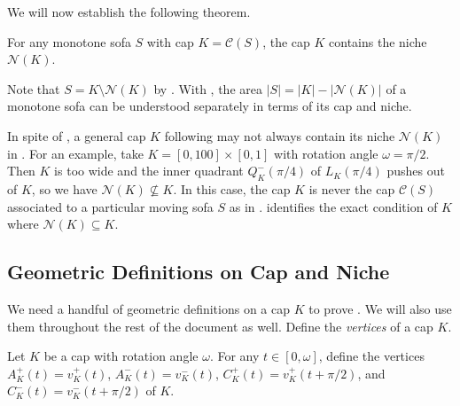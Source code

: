 We will now establish the following theorem.

\begin{theorem}

For any monotone sofa \(S\) with cap \(K = \mathcal{C}(S)\), the cap \(K\) contains the niche \(\mathcal{N}(K)\).

\label{thm:niche-in-cap}
\end{theorem}

Note that \(S = K \setminus \mathcal{N}(K)\) by . With , the area \(|S| = |K| - |\mathcal{N}(K)|\) of a monotone sofa can be understood separately in terms of its cap and niche.

\begin{remark}

In spite of , a general cap \(K\) following  may not always contain its niche \(\mathcal{N}(K)\) in . For an example, take \(K = [0, 100] \times [0, 1]\) with rotation angle \(\omega = \pi/2\). Then \(K\) is too wide and the inner quadrant \(Q_K^-(\pi/4)\) of \(L_K(\pi/4)\) pushes out of \(K\), so we have \(\mathcal{N}(K) \not\subseteq K\). In this case, the cap \(K\) is never the cap \(\mathcal{C}(S)\) associated to a particular moving sofa \(S\) as in .  identifies the exact condition of \(K\) where \(\mathcal{N}(K) \subseteq K\).

\label{rem:niche-not-in-cap}
\end{remark}

\subsection{Geometric Definitions on Cap and Niche}

We need a handful of geometric definitions on a cap \(K\) to prove . We will also use them throughout the rest of the document as well. Define the \emph{vertices} of a cap \(K\).

\begin{definition}

Let \(K\) be a cap with rotation angle \(\omega\). For any \(t \in [0, \omega]\), define the vertices \(A^+_K(t) = v^+_K(t)\), \(A^-_K(t) = v^-_K(t)\), \(C^+_K(t) = v^+_K(t + \pi/2)\), and \(C^-_K(t) = v^-_K(t + \pi/2)\) of \(K\).

\label{def:cap-vertices}
\end{definition}

